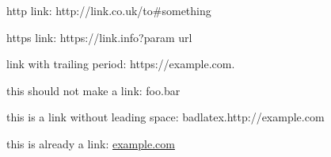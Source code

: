 

http link: http://link.co.uk/to\#something

https link: https://link.info?param url

link with trailing period: https://example.com.

this should not make a link: foo.bar

this is a link without leading space: badlatex.http://example.com

this is already a link: \href{http://example.com}{example.com}

